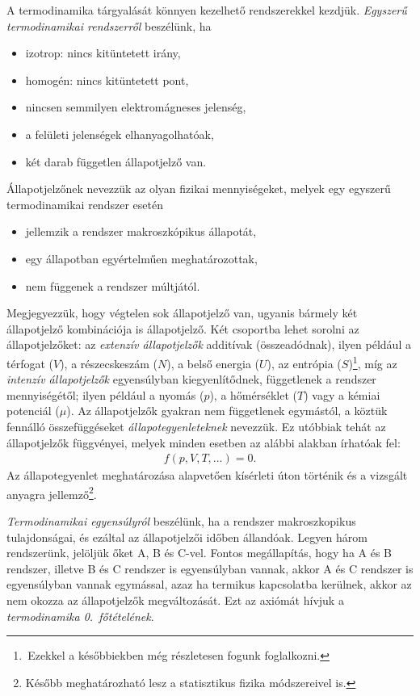\begin{itemize}
\end{itemize}
A termodinamika tárgyalását könnyen kezelhető rendszerekkel kezdjük. \emph{Egyszerű termodinamikai rendszerről} beszélünk, ha
\begin{itemize}
    \item izotrop: nincs kitüntetett irány,
    \item homogén: nincs kitüntetett pont,
    \item nincsen semmilyen elektromágneses jelenség,
    \item a felületi jelenségek elhanyagolhatóak,
    \item két darab független állapotjelző van.
\end{itemize}
Állapotjelzőnek nevezzük az olyan fizikai mennyiségeket, melyek egy egyszerű termodinamikai rendszer esetén
\begin{itemize}
    \item jellemzik a rendszer makroszkópikus állapotát,
    \item egy állapotban egyértelműen meghatározottak,
    \item nem függenek a rendszer múltjától.
\end{itemize} 
Megjegyezzük, hogy végtelen sok állapotjelző van, ugyanis bármely két állapotjelző kombinációja is állapotjelző. Két csoportba lehet sorolni az állapotjelzőket: az \emph{extenzív állapotjelzők} additívak (összeadódnak), ilyen például a térfogat ($V$), a részecskeszám ($N$), a belső energia ($U$), az entrópia ($S$)\footnote{\,Ezekkel a későbbiekben még részletesen fogunk foglalkozni.}, míg az \emph{intenzív állapotjelzők} egyensúlyban kiegyenlítődnek, függetlenek a rendszer mennyiségétől; ilyen például a nyomás ($p$), a hőmérséklet ($T$) vagy a kémiai potenciál ($\mu$). Az állapotjelzők gyakran nem függetlenek egymástól, a köztük fennálló összefüggéseket \emph{állapotegyenleteknek} nevezzük. Ez utóbbiak tehát az állapotjelzők függvényei, melyek minden esetben az alábbi alakban írhatóak fel:
\begin{align}
    f(p,V,T,\dots)=0.
\end{align}
Az állapotegyenlet meghatározása alapvetően kísérleti úton történik és a vizsgált anyagra jellemző\footnote{Később meghatározható lesz a statisztikus fizika módszereivel is.}.

\emph{Termodinamikai egyensúlyról} beszélünk, ha a rendszer makroszkopikus tulajdonságai, és ezáltal az állapotjelzői időben állandóak. Legyen három rendszerünk, jelöljük őket A, B és C-vel. Fontos megállapítás, hogy ha A és B rendszer, illetve B és C rendszer is egyensúlyban vannak, akkor A és C rendszer is egyensúlyban vannak egymással, azaz ha termikus kapcsolatba kerülnek, akkor az nem okozza az állapotjelzők megváltozását. Ezt az axiómát hívjuk a \emph{termodinamika 0.~főtételének}.

